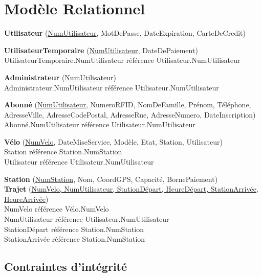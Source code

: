 \documentclass[a4paper,11pt]{report}
\begin{document}
\section{Modèle Relationnel}

\textbf{Utilisateur} (\underline{NumUtilisateur}, MotDePasse, DateExpiration, CarteDeCredit)

\textbf{UtilisateurTemporaire} (\underline{NumUtilisateur}, DateDePaiement)\\
  \phantom{Trajet}UtilisateurTemporaire.NumUtilisateur référence Utilisateur.NumUtilisateur

\textbf{Administrateur} (\underline{NumUtilisateur})\\
  \phantom{Trajet}Administrateur.NumUtilisateur référence Utilisateur.NumUtilisateur

\textbf{Abonné} (\underline{NumUtilisateur}, NumeroRFID, NomDeFamille, Prénom, Téléphone, AdresseVille,   AdresseCodePostal, AdresseRue, AdresseNumero, DateInscription)\\
  \phantom{Trajet}Abonné.NumUtilisateur référence Utilisateur.NumUtilisateur

\textbf{Vélo} (\underline{NumVelo}, DateMiseService, Modèle, Etat, Station, Utilisateur)\\
  \phantom{Trajet}Station référence Station.NumStation\\
  \phantom{Trajet}Utilisateur référence Utilisateur.NumUtilisateur

\textbf{Station} (\underline{NumStation}, Nom, CoordGPS, Capacité, BornePaiement)\\

\textbf{Trajet} (\underline{NumVelo, NumUtilisateur, StationDépart, HeureDépart, StationArrivée, HeureArrivée})\\
  \phantom{Trajet}NumVelo référence Vélo.NumVelo\\
  \phantom{Trajet}NumUtilisateur référence Utilisateur.NumUtilisateur\\
  \phantom{Trajet}StationDépart référence Station.NumStation\\
  \phantom{Trajet}StationArrivée référence Station.NumStation
  
  
\subsection{Contraintes d'intégrité}
\end{document}
